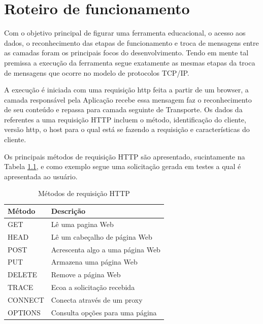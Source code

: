 
\chapter{Roteiro de funcionamento}
\label{chap:Roteiro}
Com o objetivo principal de figurar uma ferramenta educacional, o acesso aos dados, o reconhecimento das etapas de funcionamento e troca de mensagens entre as camadas foram os principais focos do desenvolvimento. Tendo em mente tal premissa a execução da ferramenta segue exatamente as mesmas etapas da troca de mensagens que ocorre no modelo de protocolos TCP/IP.

A execuç\~ao \'e iniciada com uma requisiç\~ao http feita a partir de um browser, a camada responsável pela Aplicação recebe essa mensagem faz o reconhecimento de seu conteúdo e repassa para camada seguinte de Transporte. Os dados da referentes a uma requisição HTTP incluem o método, identificação do cliente, versão http, o host para o qual está se fazendo a requisição e características do cliente.

Os principais métodos de requisição HTTP são apresentado, sucintamente na Tabela \ref{tab:requisicoesHTTP}, e como exemplo segue uma solicitação gerada em testes a qual é apresentada ao usuário.

\begin{table}[H]
	\centering
	\small
	\begin{tabular}{ |p{2cm}||p{7cm}| }
		\hline
		Método & Descrição\\
		\hline 
		GET   	& Lê uma pagina Web\\
		HEAD	& Lê um cabeçalho de página Web\\
		POST 	& Acrescenta algo a uma página Web\\
		PUT    	& Armazena uma página Web\\
		DELETE	& Remove a página Web\\
		TRACE	& Ecoa a solicitação recebida\\
		CONNECT & Conecta através de um proxy\\
		OPTIONS & Consulta opções para uma página\\
		\hline
	\end{tabular}
	\caption {Métodos de requisição HTTP}
	\label {tab:requisicoesHTTP}
	\cite{TANENBAUM}
\end{table}

